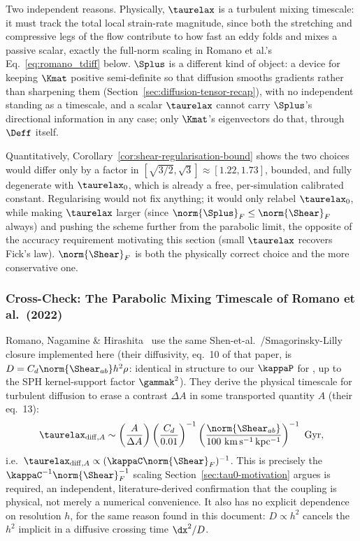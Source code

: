 \begin{remark}
\label{rem:no-shear-regularisation-in-tau}
Two independent reasons. Physically, $\taurelax$ is a turbulent mixing
timescale: it must track the total local strain-rate magnitude, since both
the stretching and compressive legs of the flow contribute to how fast an
eddy folds and mixes a passive scalar, exactly the full-norm scaling in
Romano et al.'s Eq.~\eqref{eq:romano_tdiff} below. $\Splus$ is a different
kind of object: a device for keeping $\Kmat$ positive semi-definite so
that diffusion smooths gradients rather than sharpening them
(Section~\ref{sec:diffusion-tensor-recap}), with no independent standing
as a timescale, and a scalar $\taurelax$ cannot carry $\Splus$'s
directional information in any case; only $\Kmat$'s eigenvectors do that,
through $\Deff$ itself.

Quantitatively, Corollary~\ref{cor:shear-regularisation-bound} shows the
two choices would differ only by a factor in
$[\sqrt{3/2},\sqrt3]\approx[1.22,1.73]$, bounded, and fully degenerate
with $\taurelax_0$, which is already a free, per-simulation calibrated
constant. Regularising would not fix anything; it would only relabel
$\taurelax_0$, while making $\taurelax$ larger (since
$\norm{\Splus}_F\leq\norm{\Shear}_F$ always) and pushing the scheme
further from the parabolic limit, the opposite of the accuracy
requirement motivating this section (small $\taurelax$ recovers Fick's
law). $\norm{\Shear}_F$ is both the physically correct choice and the more
conservative one.
\end{remark}

\subsubsection{Cross-Check: The Parabolic Mixing Timescale of Romano et al.~(2022)}
Romano, Nagamine \& Hirashita~\citeyear{Romano2022} use the same
Shen-et-al.~\citeyear{ShenWadsleyStinson2010}/Smagorinsky-Lilly~\citeyear{Smagorinsky1963}
closure implemented here (their diffusivity, eq.~10 of that paper, is
$D=C_d\norm{\Shear_{ab}}h^2\rho$: identical in structure to our
$\kappaP$ for , up to the SPH kernel-support
factor $\gammak^2$). They derive the physical timescale for turbulent
diffusion to erase a contrast $\Delta A$ in some transported quantity $A$
(their eq.~13):
\begin{equation}
  \label{eq:romano_tdiff}
  \taurelax_{{\rm diff},A} \sim \left(\frac{A}{\Delta A}\right)
  \left(\frac{C_d}{0.01}\right)^{-1}
  \left(\frac{\norm{\Shear_{ab}}}{100\ {\rm km\,s^{-1}\,kpc^{-1}}}\right)^{-1}\ {\rm Gyr} ,
\end{equation}
i.e.\ $\taurelax_{{\rm diff},A}\propto(\kappaC\norm{\Shear}_F)^{-1}$. This
is precisely the $\kappaC^{-1}\norm{\Shear}_F^{-1}$ scaling
Section~\ref{sec:tau0-motivation} argues is required, an independent,
literature-derived confirmation that the coupling is physical, not merely
a numerical convenience. It also has no explicit dependence on resolution
$h$, for the same reason found in this document: $D\propto h^2$ cancels
the $h^2$ implicit in a diffusive crossing time $\dx^2/D$.

